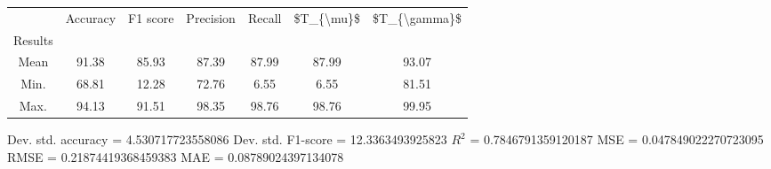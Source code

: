 \begin{tabular}{|c|c|c|c|c|c|c|}
\toprule
{} &  Accuracy &  F1 score &  Precision &  Recall &  \$T\_\{\textbackslash mu\}\$ &  \$T\_\{\textbackslash gamma\}\$ \\
Results &           &           &            &         &            &               \\
\hline
Mean    &     91.38 &     85.93 &      87.39 &   87.99 &      87.99 &         93.07 \\
Min.    &     68.81 &     12.28 &      72.76 &    6.55 &       6.55 &         81.51 \\
Max.    &     94.13 &     91.51 &      98.35 &   98.76 &      98.76 &         99.95 \\
\bottomrule
\end{tabular}

 Dev. std. accuracy = 4.530717723558086
 Dev. std. F1-score = 12.3363493925823
 $R^2$ = 0.7846791359120187
 MSE = 0.047849022270723095
 RMSE = 0.21874419368459383
 MAE = 0.08789024397134078
